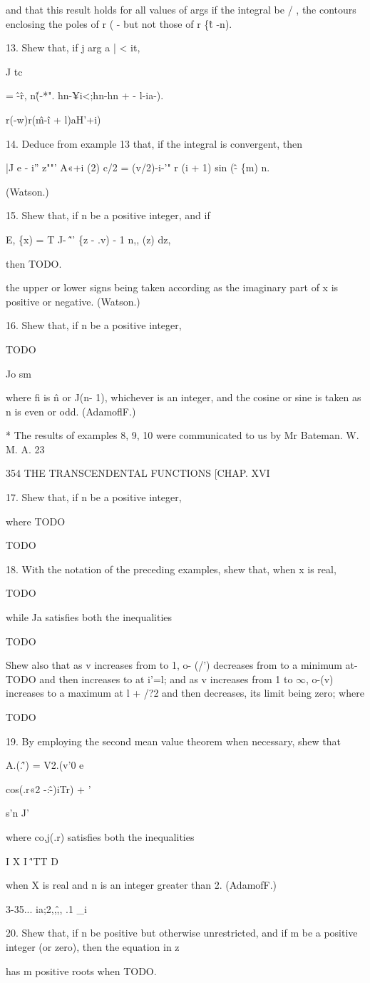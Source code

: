 and that this result holds for all values of args if the integral be /
, the contours enclosing the poles of r ( - but not those of r \{\^t
-n).

13. Shew that, if j arg a | < it,

J tc

= \^-\^ r, n\^(-*". hn-¥i<;hn-hn + - l-ia-).

r(-w)r(\^m-\^i + l)aH'+i)

14. Deduce from example 13 that, if the integral is convergent, then

|J e - i'' z""' A«+i (2) c/2 = (v/2)-i-'" r (i + 1) sin (\^ - \{m) n.

(Watson.)

15. Shew that, if n be a positive integer, and if

E, \{x) = T J- \^'' \{z - .v) - 1 n,, (z) dz,

then TODO.

the upper or lower signs being taken according as the imaginary part
of x is positive or negative. (Watson.)

16. Shew that, if n be a positive integer,

TODO

Jo sm

where fi is \^n or J(n- 1), whichever is an integer, and the cosine or
sine is taken as n is even or odd. (AdamoflF.)

* The results of examples 8, 9, 10 were communicated to us by Mr
Bateman. W. M. A. 23

354 THE TRANSCENDENTAL FUNCTIONS [CHAP. XVI

17. Shew that, if n be a positive integer,

where TODO

TODO 

18. With the notation of the preceding examples, shew that, when x is
real,

TODO

while Ja satisfies both the inequalities

TODO

Shew also that as v increases from to 1, o- (/') decreases from to a
minimum at- TODO and then increases to at i'=l; and as v increases
from 1 to $\infty$, o-(v) increases to a maximum at l + /?2 and then
decreases, its limit being zero; where

TODO 

19. By employing the second mean value theorem when necessary, shew
that

A.(.\^') = V2.(v'0 e

cos(.r«2 -:\^-)iTr) + '

s'n J'

where co,j(.r) satisfies both the inequalities

I X I \^'TT D

when X is real and n is an integer greater than 2. (AdamofF.)

3-35... ia;2,,\^,, .1 \_i

20. Shew that, if n be positive but otherwise unrestricted, and if m
be a positive integer (or zero), then the equation in z

has m positive roots when TODO. 